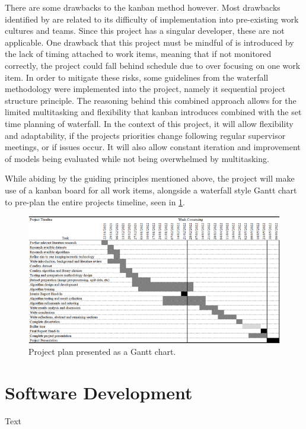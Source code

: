 There are some drawbacks to the kanban method however. Most drawbacks identified by \cite{ahmad2013kanban} are related to its difficulty of implementation into pre-existing work cultures and teams. Since this project has a singular developer, these are not applicable. One drawback that this project must be mindful of is introduced by the lack of timing attached to work items, meaning that if not monitored correctly, the project could fall behind schedule due to over focusing on one work item. In order to mitigate these risks, some guidelines from the waterfall methodology were implemented into the project, namely it sequential project structure principle. The reasoning behind this combined approach allows for the limited multitasking and flexibility that kanban introduces combined with the set time planning of waterfall. In the context of this project, it will allow flexibility and adaptability, if the projects priorities change following regular supervisor meetings, or if issues occur. It will also allow constant iteration and improvement of models being evaluated while not being overwhelmed by multitasking.

While abiding by the guiding principles mentioned above, the project will make use of a kanban board for all work items, alongside a waterfall style Gantt chart to pre-plan the entire projects timeline, seen in \ref{fig:gantt-chart}.

\begin{figure}[H]
    \centering
    \includegraphics[width=\textwidth]{figures/gantt-chart.png}
    \caption{Project plan presented as a Gantt chart.}
    \label{fig:gantt-chart}
\end{figure}

\section{Software Development}
Text

